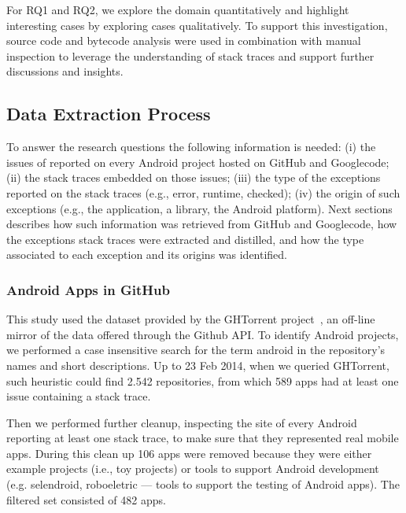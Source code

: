 \documentclass[conference]{IEEEtran}
\begin{document}
For RQ1 and RQ2, we explore the domain quantitatively and highlight interesting cases by 
exploring cases qualitatively. To support this investigation, source code and bytecode 
analysis were used in combination with manual inspection to leverage the  understanding 
of stack traces and support further discussions and insights. 

\subsection{Data Extraction Process}
\label{sec:miningproc}

To answer the research questions the following information is needed: (i) the issues of reported on every Android project hosted on 
GitHub and Googlecode; (ii) the stack traces embedded on those issues; (iii) the type of the exceptions
 reported on the stack traces (e.g., error, runtime, checked); (iv) the origin of such exceptions 
(e.g., the application, a library, the Android platform). Next sections describes how such information 
was retrieved from GitHub and Googlecode, how the exceptions stack traces were extracted and distilled,
 and how the type associated to each exception and its origins was identified.


\subsubsection{Android Apps in GitHub}
\label{sec:git}


This study used the dataset provided by the GHTorrent project~\cite{Gousi13}, 
an off-line mirror of the data  offered through the Github API.  
To identify Android projects, we performed a case insensitive search for the
term \textsf{android} in the repository's names and short descriptions.  
Up to 23 Feb 2014,  when we queried GHTorrent, such heuristic could
 find 2.542 repositories,  from which 589 apps had at least one
issue containing a stack trace.

Then we performed further cleanup, inspecting the site of every Android
reporting at least one stack trace, to make sure that they represented real
mobile apps. During this clean up 106 apps were removed because they were either
example projects (i.e., toy projects) or tools to support Android development
(e.g. \textsf{selendroid}, \textsf{roboeletric} --- tools to support the testing of Android apps).
The filtered set consisted of 482 apps. 
\end{document}
